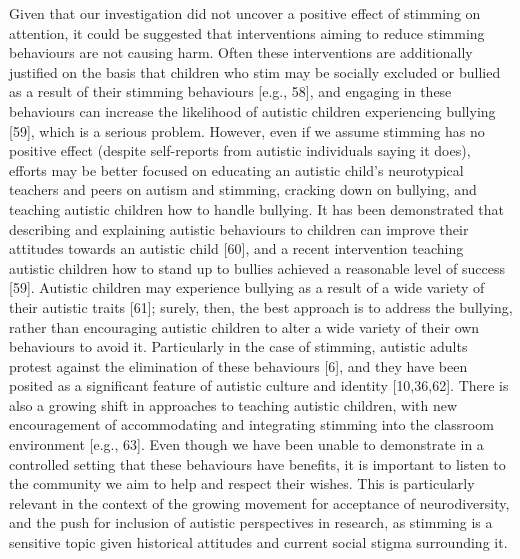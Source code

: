 \documentclass[
  letterpaper,
  DIV=11,
  numbers=noendperiod]{scrartcl}
\begin{document}
Given that our investigation did not uncover a positive effect of
stimming on attention, it could be suggested that interventions aiming
to reduce stimming behaviours are not causing harm. Often these
interventions are additionally justified on the basis that children who
stim may be socially excluded or bullied as a result of their stimming
behaviours {[}e.g., 58{]}, and engaging in these behaviours can increase
the likelihood of autistic children experiencing bullying {[}59{]},
which is a serious problem. However, even if we assume stimming has no
positive effect (despite self-reports from autistic individuals saying
it does), efforts may be better focused on educating an autistic child's
neurotypical teachers and peers on autism and stimming, cracking down on
bullying, and teaching autistic children how to handle bullying. It has
been demonstrated that describing and explaining autistic behaviours to
children can improve their attitudes towards an autistic child {[}60{]},
and a recent intervention teaching autistic children how to stand up to
bullies achieved a reasonable level of success {[}59{]}. Autistic
children may experience bullying as a result of a wide variety of their
autistic traits {[}61{]}; surely, then, the best approach is to address
the bullying, rather than encouraging autistic children to alter a wide
variety of their own behaviours to avoid it. Particularly in the case of
stimming, autistic adults protest against the elimination of these
behaviours {[}6{]}, and they have been posited as a significant feature
of autistic culture and identity {[}10,36,62{]}. There is also a growing
shift in approaches to teaching autistic children, with new
encouragement of accommodating and integrating stimming into the
classroom environment {[}e.g., 63{]}. Even though we have been unable to
demonstrate in a controlled setting that these behaviours have benefits,
it is important to listen to the community we aim to help and respect
their wishes. This is particularly relevant in the context of the
growing movement for acceptance of neurodiversity, and the push for
inclusion of autistic perspectives in research, as stimming is a
sensitive topic given historical attitudes and current social stigma
surrounding it.
\end{document}
